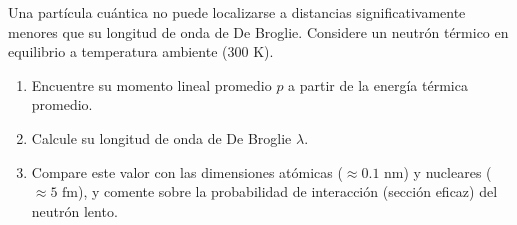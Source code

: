 \item Una partícula cuántica no puede localizarse a distancias significativamente menores que su longitud de onda de De Broglie. Considere un neutrón térmico en equilibrio a temperatura ambiente ($300\text{ K}$).
\begin{enumerate}
    \item Encuentre su momento lineal promedio $p$ a partir de la energía térmica promedio.
    \item Calcule su longitud de onda de De Broglie $\lambda$.
    \item Compare este valor con las dimensiones atómicas ($\approx 0.1\text{ nm}$) y nucleares ($\approx 5\text{ fm}$), y comente sobre la probabilidad de interacción (sección eficaz) del neutrón lento.
\end{enumerate}